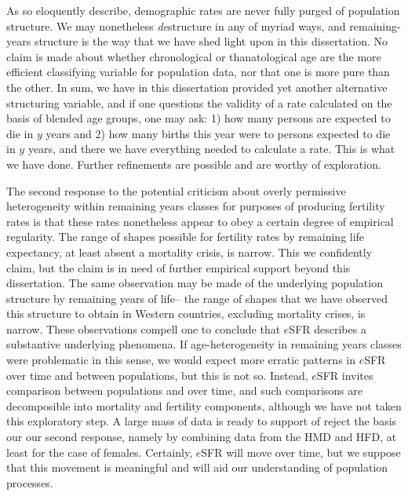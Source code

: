 As \citet{stolnitz1949recent} so eloquently describe, demographic rates are
never fully purged of population structure. We may nonetheless \textit{de}structure in
any of myriad ways, and remaining-years structure is the way that we have shed
light upon in this dissertation. No claim is made about whether chronological or
thanatological age are the more efficient classifying variable for population
data, nor that one is more pure than the other. In sum, we have in this
dissertation provided yet another alternative structuring variable, and if one
questions the validity of a rate calculated on the basis of blended age groups,
one may ask: 1) how many persons are expected to die in $y$ years and 2) how
many births this year were to persons expected to die in $y$ years, and there we
have everything needed to calculate a rate. This is what we have done. Further
refinements are possible and are worthy of exploration.

The second response to the potential criticism about overly permissive
heterogeneity within remaining years classes for purposes of producing
fertility rates is that these rates nonetheless appear to obey a
certain degree of empirical regularity. The range of shapes possible for
fertility rates by remaining life expectancy, at least absent a mortality
crisis, is narrow. This we confidently claim, but the claim is in need of
further empirical support beyond this dissertation. The same observation may be made of
the underlying population structure by remaining years of life-- the range of 
shapes that we have observed this structure to obtain in Western countries, 
excluding mortality crises, is
narrow. These observations compell one to conclude that $e$SFR describes
a substantive underlying phenomena. If age-heterogeneity in remaining years
classes were problematic in this sense, we would expect more erratic patterns in
$e$SFR over time and between populations, but this is not so. Instead, $e$SFR
invites comparison between populations and over time, and such comparisons are
decomposible into mortality and fertility components, although we have not
taken this exploratory step. A large mass of data is ready to support of reject
the basis our our second response, namely by combining data from the HMD and
HFD, at least for the case of females. Certainly, $e$SFR will move over time,
but we suppose that this movement is meaningful and will aid our understanding
of population processes.

